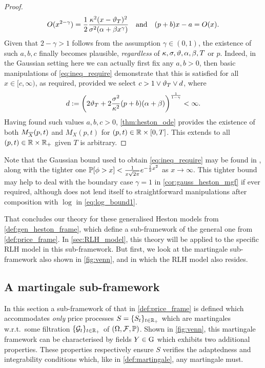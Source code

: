 \begin{proof}
    \begin{equation}\label{eq:ineq_require1}
        O(x^{2-\gamma}) = \frac12\frac{\kappa^2(x - \vartheta_T)^2}{\sigma^2(\alpha + \beta x^{\gamma})}\quad \text{and}\quad (p+b) x - a = O(x).
    \end{equation}
    Given that $2-\gamma>1$ follows from the assumption $\gamma\in(0,1)$, the existence of such $a,b,c$ finally becomes plausible, \emph{regardless} of $\kappa,\sigma,\vartheta,\alpha,\beta,T$ or $p$. Indeed, in the Gaussian setting here we can actually first fix any $a,b>0$, then basic manipulations of \autoref{eq:ineq_require} demonstrate that this is satisfied for all $x\in[c,\infty)$, as required, provided we select $c>1\vee\vartheta_T\vee d$, where
    \begin{equation}
        d := \left( 2\vartheta_T + 2\frac{\sigma^2}{\kappa^2}(p+b)(\alpha + \beta) \right)^{\frac{1}{1-\gamma}}<\infty.
    \end{equation}
    Having found such values $a,b,c>0$, \autoref{thm:heston_ode} provides the existence of both $M_{\overline{X}}(p,t)$ and $M_X(p,t)$ for $(p,t)\in\mathbb{R}\times[0,T]$. This extends to all  $(p,t)\in\mathbb{R}\times\mathbb{R}_+$ given $T$ is arbitrary.
\end{proof}

Note that the Gaussian bound used to obtain \autoref{eq:ineq_require} may be found in \cite{feller_1968}, along with the tighter one $\mathbb{P}[\phi>x]<\frac{1}{x\sqrt{2\pi}}e^{-\frac12 x^2}$ as $x\to\infty$. This tighter bound may help to deal with the boundary case $\gamma=1$ in \autoref{cor:gauss_heston_mgf} if ever required, although does not lend itself to straightforward manipulations after composition with $\log$ in \autoref{eq:log_bound1}.

That concludes our theory for these generalised Heston models from \autoref{def:gen_heston_frame}, which define a sub-framework of the general one from \autoref{def:price_frame}. In \autoref{sec:RLH_model}, this theory will be applied to the specific RLH model in this sub-framework. But first, we look at the martingale sub-framework also shown in \autoref{fig:venn}, and in which the RLH model also resides.

\subsection{A martingale sub-framework}\label{sec:martingale}

In this section a sub-framework of that in \autoref{def:price_frame} is defined which accommodates \emph{only} price processes $S=\{S_t\}_{t\in\mathbb{R}_+}$ which are martingales w.r.t.~some filtration $\{\mathcal{G}_t\}_{t\in\mathbb{R}_+}$ of $(\Omega,\mathcal{F},\mathbb{P})$. Shown in \autoref{fig:venn}, this martingale framework can be characterised by fields $Y\in\mathrm{G}$ which exhibits two additional properties. These properties respectively ensure $S$ verifies the adaptedness and integrability conditions which, like in \autoref{def:martingale}, any martingale must.


